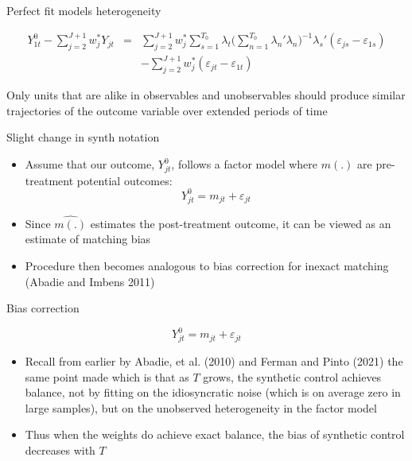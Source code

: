\documentclass{beamer}
\begin{document}
\begin{frame}{Perfect fit models heterogeneity}


\begin{eqnarray*}
Y^0_{1t} - \sum^{J+1}_{j=2}w^*_jY_{jt} &=& \sum_{j=2}^{J+1} w_j^* \sum_{s=1}^{T_0} \lambda_t \bigg ( \sum_{n=1}^{T_0} \lambda_n'\lambda_n \bigg )
^{-1} \lambda_s'(\varepsilon_{js} - \varepsilon_{1s} ) \\
&& - \sum_{j=2}^{J+1} w_j^* (\varepsilon_{jt} - \varepsilon_{1t})
\end{eqnarray*}

Only units that are alike in observables and unobservables should produce similar trajectories of the outcome variable over extended periods of time


\end{frame}



\begin{frame}{Slight change in synth notation}

\begin{itemize}
\item Assume that our outcome, $Y^0_{jt}$, follows a factor model where $m(.)$ are pre-treatment potential outcomes: $$ Y_{jt}^0 = m_{jt} + \varepsilon_{jt}$$
\item Since $\widehat{m(.)}$ estimates the post-treatment outcome, it can be viewed as an estimate of matching bias
\item Procedure then becomes analogous to bias correction for inexact matching (Abadie and Imbens 2011)
\end{itemize}

\end{frame}



\begin{frame}{Bias correction}

 $$ Y_{jt}^0 = m_{jt} + \varepsilon_{jt}$$

\begin{itemize}
\item Recall from earlier by Abadie, et al. (2010) and Ferman and Pinto (2021) the same point made which is that as $T$ grows, the synthetic control achieves balance, not by fitting on the idiosyncratic noise (which is on average zero in large samples), but on the unobserved heterogeneity in the factor model
\item Thus when the weights do achieve exact balance, the bias of synthetic control decreases with $T$
\end{itemize}

\end{frame}
\end{document}
